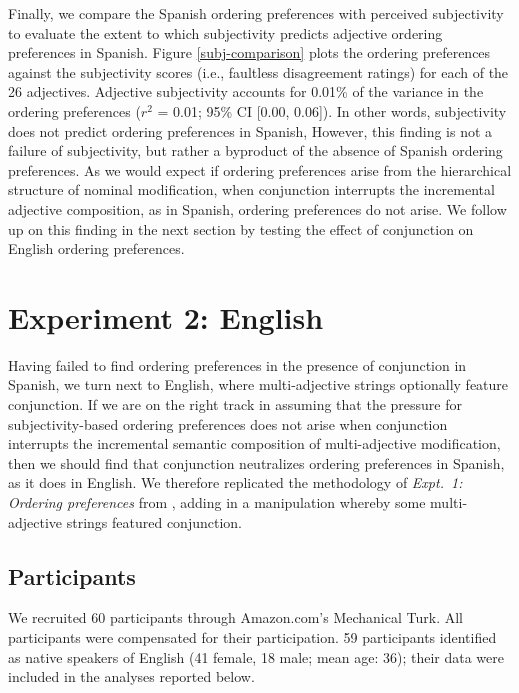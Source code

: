 \documentclass[12pt,letterpaper]{article}
\begin{document}
Finally, we compare the Spanish ordering preferences with perceived subjectivity to evaluate the extent to which subjectivity predicts adjective ordering preferences in Spanish. Figure \ref{subj-comparison} plots the ordering preferences against the subjectivity scores (i.e., faultless disagreement ratings) for each of the 26 adjectives. Adjective subjectivity accounts for 0.01\% of the variance in the ordering preferences ($r^2$ = 0.01; 95\% CI [0.00, 0.06]). In other words, subjectivity does not predict ordering preferences in Spanish, However, this finding is not a failure of subjectivity, but rather a byproduct of the absence of Spanish ordering preferences. As we would expect if ordering preferences arise from the hierarchical structure of nominal modification, when conjunction interrupts the incremental adjective composition, as in Spanish, ordering preferences do not arise. We follow up on this finding in the next section by testing the effect of conjunction on English ordering preferences.



\section{Experiment 2: English} \label{english}

Having failed to find ordering preferences in the presence of conjunction in Spanish, we turn next to English, where multi-adjective strings optionally feature conjunction. If we are on the right track in assuming that the pressure for subjectivity-based ordering preferences does not arise when conjunction interrupts the incremental semantic composition of multi-adjective modification, then we should find that conjunction neutralizes ordering preferences in Spanish, as it does in English. We therefore replicated the methodology of \emph{Expt.~1: Ordering preferences} from \cite{scontrasetal2017adjectives}, adding in a manipulation whereby some multi-adjective strings featured conjunction.

\subsection{Participants}


We recruited 60 participants through Amazon.com's Mechanical Turk. All participants were compensated for their participation. 59 participants identified as native speakers of English (41 female, 18 male; mean age: 36); their data were included in the analyses reported below.
\end{document}
